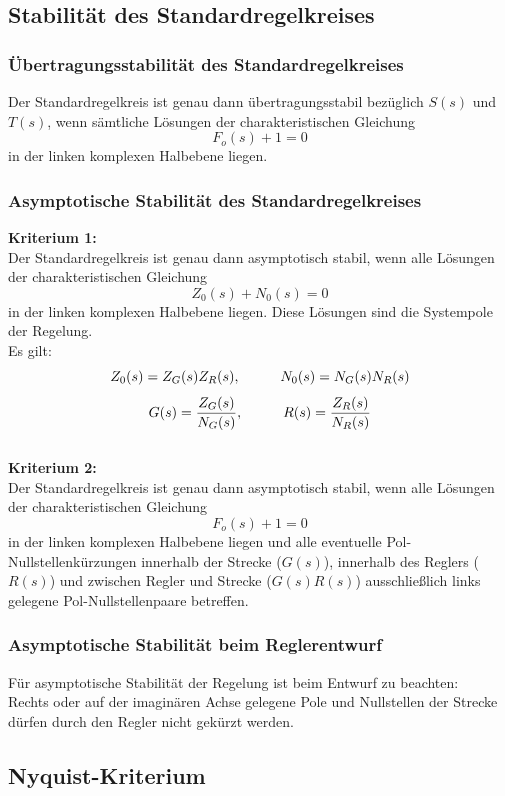 \documentclass[10pt,a4paper]{article}
\newcommand{\tab}[1][1]{\hspace*{#1cm}}
\begin{document}
\subsection{Stabilität des Standardregelkreises}
\subsubsection{Übertragungsstabilität des Standardregelkreises}
Der Standardregelkreis ist genau dann übertragungsstabil bezüglich $S(s)$ und $T(s)$, wenn sämtliche Lösungen der charakteristischen Gleichung 
$$
	F_o(s) + 1 = 0
$$
in der linken komplexen Halbebene liegen.

\subsubsection{Asymptotische Stabilität des Standardregelkreises}
\textbf{Kriterium 1:} \\
Der Standardregelkreis ist genau dann asymptotisch stabil, wenn alle Lösungen der charakteristischen Gleichung 
$$
	Z_0(s) + N_0(s) = 0
$$
in der linken  komplexen Halbebene liegen. Diese Lösungen sind die Systempole der Regelung. \\
Es gilt: 
$$
	Z_0(s) = Z_G(s)Z_R(s), \tab N_0(s) = N_G(s)N_R(s)
$$
$$
	G(s) = \frac{Z_G(s)}{N_G(s)}, \tab R(s) = \frac{Z_R(s)}{N_R(s)}
$$ \\

\textbf{Kriterium 2:} \\
Der Standardregelkreis ist genau dann asymptotisch stabil, wenn alle Lösungen der charakteristischen Gleichung
$$
	F_o(s) + 1 = 0
$$
in der linken komplexen Halbebene liegen und alle eventuelle Pol-Nullstellenkürzungen innerhalb der Strecke ($G(s)$), innerhalb des Reglers ($R(s)$) und zwischen Regler und Strecke ($G(s)R(s)$) ausschließlich links gelegene Pol-Nullstellenpaare betreffen.

\subsubsection{Asymptotische Stabilität beim Reglerentwurf}
Für asymptotische Stabilität der Regelung ist beim Entwurf zu beachten: \\
Rechts oder auf der imaginären Achse gelegene Pole und Nullstellen der Strecke dürfen durch den Regler nicht gekürzt werden.

\subsection{Nyquist-Kriterium}
\end{document}
